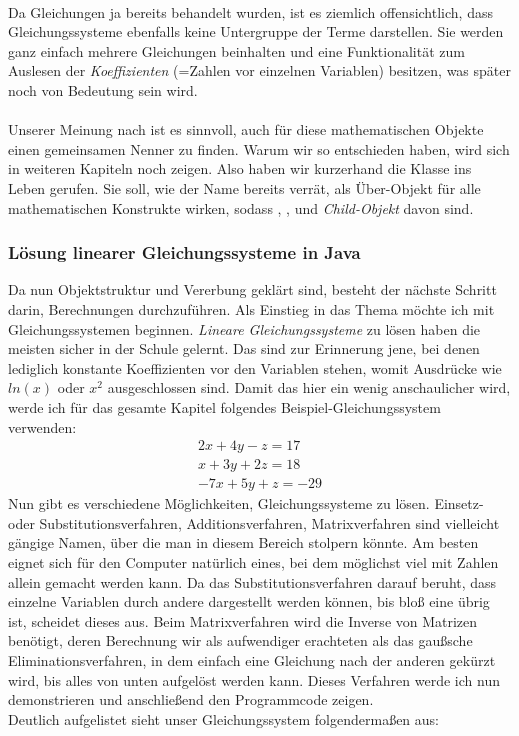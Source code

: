 \\
Da Gleichungen ja bereits behandelt wurden, ist es ziemlich offensichtlich, dass Gleichungssysteme ebenfalls keine Untergruppe der Terme darstellen. Sie werden ganz einfach mehrere Gleichungen beinhalten und eine Funktionalität zum Auslesen der \textit{Koeffizienten} (=Zahlen vor einzelnen Variablen) besitzen, was später noch von Bedeutung sein wird.\\
\\
Unserer Meinung nach ist es sinnvoll, auch für diese mathematischen Objekte einen gemeinsamen Nenner zu finden. Warum wir so entschieden haben, wird sich in weiteren Kapiteln noch zeigen. Also haben wir kurzerhand die Klasse  ins Leben gerufen. Sie soll, wie der Name bereits verrät, als Über-Objekt für alle mathematischen Konstrukte wirken, sodass , ,  und  \textit{Child-Objekt} davon sind.

\subsubsection{Lösung linearer Gleichungssysteme in Java}
Da nun Objektstruktur und Vererbung geklärt sind, besteht der nächste Schritt darin, Berechnungen durchzuführen. Als Einstieg in das Thema möchte ich mit Gleichungssystemen beginnen. \textit{Lineare Gleichungssysteme} zu lösen haben die meisten sicher in der Schule gelernt. Das sind zur Erinnerung jene, bei denen lediglich konstante Koeffizienten vor den Variablen stehen, womit Ausdrücke wie $ln(x)$ oder $x^2$ ausgeschlossen sind. Damit das hier ein wenig anschaulicher wird, werde ich für das gesamte Kapitel folgendes Beispiel-Gleichungssystem verwenden:
\begin{gather*}
2x + 4y - z = 17\\
x + 3y + 2z = 18\\
-7x + 5y + z = -29
\end{gather*}
\noindent
Nun gibt es verschiedene Möglichkeiten, Gleichungssysteme zu lösen. Einsetz- oder Substitutionsverfahren, Additionsverfahren, Matrixverfahren sind vielleicht gängige Namen, über die man in diesem Bereich stolpern könnte. Am besten eignet sich für den Computer natürlich eines, bei dem möglichst viel mit Zahlen allein gemacht werden kann. Da das Substitutionsverfahren darauf beruht, dass einzelne Variablen durch andere dargestellt werden können, bis bloß eine übrig ist, scheidet dieses aus. Beim Matrixverfahren wird die Inverse von Matrizen benötigt, deren Berechnung wir als aufwendiger erachteten als das gaußsche Eliminationsverfahren, in dem einfach eine Gleichung nach der anderen gekürzt wird, bis alles von unten aufgelöst werden kann. Dieses Verfahren werde ich nun demonstrieren und anschließend den Programmcode zeigen.\\
Deutlich aufgelistet sieht unser Gleichungssystem folgendermaßen aus:

